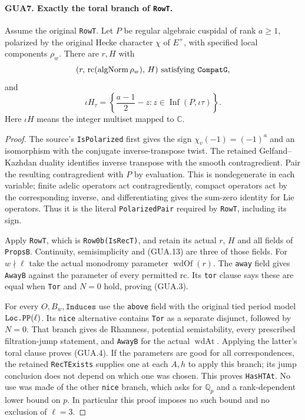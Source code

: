 \documentclass[11pt,a4paper]{article}
\numberwithin{equation}{section}
\theoremstyle{remark}\newtheorem{remark}[theorem]{Remark}
\begin{document}
\paragraph{GUA7. Exactly the toral branch of \texttt{Row\allowbreak T}.}
\label{claim:GUA7}
Assume the original \texttt{Row\allowbreak T}.  Let $P$ be regular
algebraic cuspidal of rank $a\geq1$, polarized by the
original Hecke character $\chi$ of $E^+$, with
specified local components $\rho_w$.  There are $r,H$
with
\[
 (r,\,\mathrm{rc}(\operatorname{algNorm}\rho_w),\,H)
                                      \text{ satisfying \texttt{Compat\allowbreak G}},
\]
and
\[
   \iota H_\tau
       =\left\{\frac{a-1}{2}-z:
             z\in\operatorname{Inf}(P,\iota\tau)\right\}.
                                                        \tag{GUA.13}
\]
Here $\iota H$ means the integer multiset mapped to $\mathbb C$.
\begin{proof}
The source's \texttt{Is\allowbreak Polarized} first gives the sign
$\chi_v(-1)=(-1)^a$ and an isomorphism with the conjugate
inverse-transpose twist.  The retained
Gelfand--Kazhdan duality identifies inverse transpose
with the smooth contragredient.  Pair the resulting
contragredient with $P$ by evaluation.  This is
nondegenerate in each variable; finite adelic operators
act contragrediently, compact operators act by the
corresponding inverse, and differentiating gives the
sum-zero identity for Lie operators.  Thus it is
the literal \texttt{Polarized\allowbreak Pair} required by
\texttt{Row\allowbreak T}, including its sign.

Apply \texttt{Row\allowbreak T}, which is \texttt{Row0b(Is\allowbreak Rec\allowbreak T)},
and retain its actual $r$, $H$ and all fields of
\texttt{Props\allowbreak B}.  Continuity, semisimplicity and
(GUA.13) are three of those fields.  For $w\nmid\ell$
take the actual monodromy parameter $\operatorname{wdOf}(r)$.
The \texttt{away} field gives \texttt{Away\allowbreak B} against
the parameter of every permitted $\mathrm{rc}$.  Its
\texttt{tor} clause says these are equal when
\texttt{Tor} and $N=0$ hold, proving (GUA.3).

For every $O,B_w,\texttt{Induces}$ use the \texttt{above}
field with the original tied period model
$\texttt{Loc.\allowbreak PP}(\ell)$.  Its \texttt{nice} alternative
contains \texttt{Tor} as a separate disjunct, followed
by $N=0$.  That branch gives de Rhamness, potential
semistability, every prescribed filtration-jump statement,
and \texttt{Away\allowbreak B} for the actual $\operatorname{wdAt}$.
Applying the latter's toral clause proves (GUA.4).
If the parameters are good for all correspondences,
the retained \texttt{Rec\allowbreak TExists} supplies one at each
$A,h$ to apply this branch; its jump conclusion does
not depend on which one was chosen.  This proves
\texttt{Has\allowbreak HTAt}.  No use was made of the other
\texttt{nice} branch, which asks for $\mathbb Q_p$
and a rank-dependent lower bound on $p$.  In particular
this proof imposes no such bound and no exclusion of $\ell=3$.
\end{proof}
\end{document}
